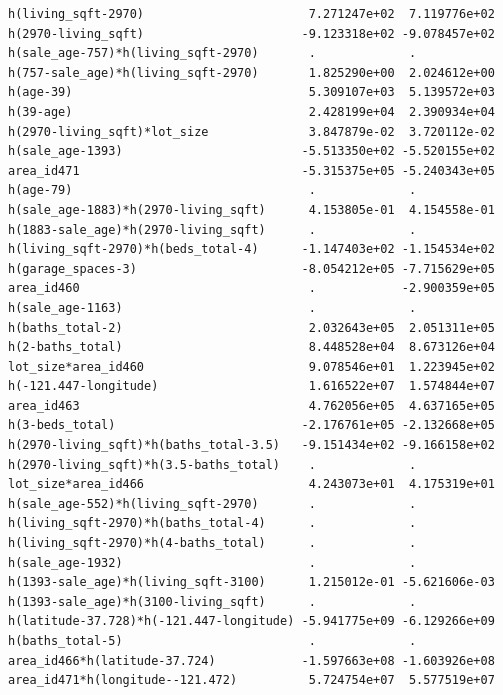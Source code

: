 \documentclass[
]{article}
\begin{document}
\begin{verbatim}
h(living_sqft-2970)                       7.271247e+02  7.119776e+02
h(2970-living_sqft)                      -9.123318e+02 -9.078457e+02
h(sale_age-757)*h(living_sqft-2970)       .             .           
h(757-sale_age)*h(living_sqft-2970)       1.825290e+00  2.024612e+00
h(age-39)                                 5.309107e+03  5.139572e+03
h(39-age)                                 2.428199e+04  2.390934e+04
h(2970-living_sqft)*lot_size              3.847879e-02  3.720112e-02
h(sale_age-1393)                         -5.513350e+02 -5.520155e+02
area_id471                               -5.315375e+05 -5.240343e+05
h(age-79)                                 .             .           
h(sale_age-1883)*h(2970-living_sqft)      4.153805e-01  4.154558e-01
h(1883-sale_age)*h(2970-living_sqft)      .             .           
h(living_sqft-2970)*h(beds_total-4)      -1.147403e+02 -1.154534e+02
h(garage_spaces-3)                       -8.054212e+05 -7.715629e+05
area_id460                                .            -2.900359e+05
h(sale_age-1163)                          .             .           
h(baths_total-2)                          2.032643e+05  2.051311e+05
h(2-baths_total)                          8.448528e+04  8.673126e+04
lot_size*area_id460                       9.078546e+01  1.223945e+02
h(-121.447-longitude)                     1.616522e+07  1.574844e+07
area_id463                                4.762056e+05  4.637165e+05
h(3-beds_total)                          -2.176761e+05 -2.132668e+05
h(2970-living_sqft)*h(baths_total-3.5)   -9.151434e+02 -9.166158e+02
h(2970-living_sqft)*h(3.5-baths_total)    .             .           
lot_size*area_id466                       4.243073e+01  4.175319e+01
h(sale_age-552)*h(living_sqft-2970)       .             .           
h(living_sqft-2970)*h(baths_total-4)      .             .           
h(living_sqft-2970)*h(4-baths_total)      .             .           
h(sale_age-1932)                          .             .           
h(1393-sale_age)*h(living_sqft-3100)      1.215012e-01 -5.621606e-03
h(1393-sale_age)*h(3100-living_sqft)      .             .           
h(latitude-37.728)*h(-121.447-longitude) -5.941775e+09 -6.129266e+09
h(baths_total-5)                          .             .           
area_id466*h(latitude-37.724)            -1.597663e+08 -1.603926e+08
area_id471*h(longitude--121.472)          5.724754e+07  5.577519e+07
                                                                    

\end{verbatim}
\end{document}
